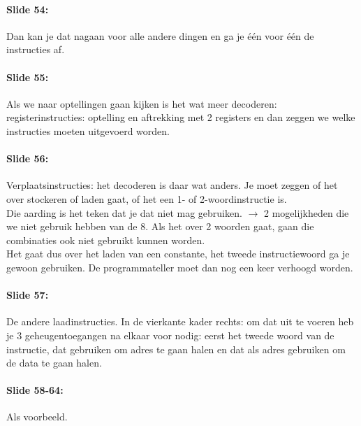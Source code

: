 \documentclass[10pt,a4paper]{book}
\begin{document}
\paragraph{Slide 54:} Dan kan je dat nagaan voor alle andere dingen en ga je \'e\'en voor \'e\'en de instructies af.

\paragraph{Slide 55:} Als we naar optellingen gaan kijken is het wat meer decoderen: registerinstructies: optelling en aftrekking met 2 registers en dan zeggen we welke instructies moeten uitgevoerd worden.

\paragraph{Slide 56:} Verplaatsinstructies: het decoderen is daar wat anders. Je moet zeggen of het over stockeren of laden gaat, of het een 1- of 2-woordinstructie is.\\
Die aarding is het teken dat je dat niet mag gebruiken. $\rightarrow$ 2 mogelijkheden die we niet gebruik hebben van de 8. Als het over 2 woorden gaat, gaan die combinaties ook niet gebruikt kunnen worden. \\
Het gaat dus over het laden van een constante, het tweede instructiewoord ga je gewoon gebruiken. De programmateller moet dan nog een keer verhoogd worden.

\paragraph{Slide 57:} De andere laadinstructies. In de vierkante kader rechts: om dat uit te voeren heb je 3 geheugentoegangen na elkaar voor nodig: eerst het tweede woord van de instructie, dat gebruiken om adres te gaan halen en dat als adres gebruiken om de data te gaan halen.

\paragraph{Slide 58-64:} Als voorbeeld.
\end{document}
